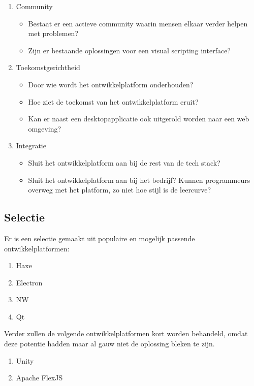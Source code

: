 \begin{enumerate}
    \item Community
    \begin{itemize}
        \item Bestaat er een actieve community waarin mensen elkaar verder helpen met problemen?
        \item Zijn er bestaande oplossingen voor een visual scripting interface?
    \end{itemize}    
    \item Toekomstgerichtheid
    \begin{itemize}
        \item Door wie wordt het ontwikkelplatform onderhouden?
        \item Hoe ziet de toekomst van het ontwikkelplatform eruit?
        \item Kan er naast een desktopapplicatie ook uitgerold worden naar een web omgeving?
    \end{itemize}
    \item Integratie
    \begin{itemize}
        \item Sluit het ontwikkelplatform aan bij de rest van de tech stack?
        \item Sluit het ontwikkelplatform aan bij het bedrijf? Kunnen programmeurs overweg met het platform, zo niet hoe stijl is de leercurve?
    \end{itemize}
\end{enumerate}

\subsection{Selectie}
Er is een selectie gemaakt uit populaire en mogelijk passende ontwikkelplatformen:
\begin{enumerate}
    \item Haxe
    \item Electron
    \item NW
    \item Qt    
\end{enumerate}

Verder zullen de volgende ontwikkelplatformen kort worden behandeld, omdat deze potentie hadden maar al gauw niet de oplossing bleken te zijn.
\begin{enumerate}
    \item Unity
    \item Apache FlexJS
\end{enumerate}

